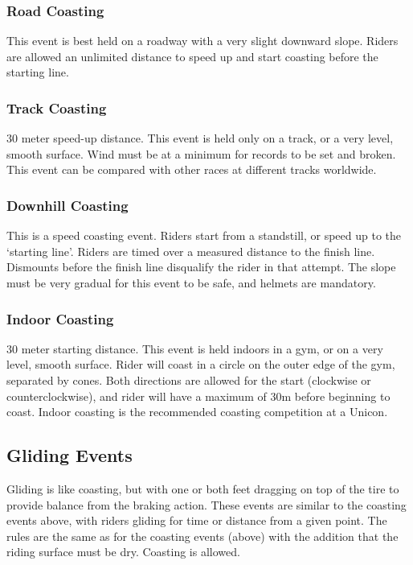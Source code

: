 \subsubsection{Road Coasting}
This event is best held on a roadway with a very slight downward slope.
Riders are allowed an unlimited distance to speed up and start coasting before the starting line.

\subsubsection{Track Coasting \label{subsubsec:track-field_alternate-optional-fun-events_coasting_track-coasting}}
30 meter speed-up distance.
This event is held only on a track, or a very level, smooth surface.
Wind must be at a minimum for records to be set and broken.
This event can be compared with other races at different tracks worldwide.

\subsubsection{Downhill Coasting}
This is a speed coasting event.
Riders start from a standstill, or speed up to the `starting line'.
Riders are timed over a measured distance to the finish line.
Dismounts before the finish line disqualify the rider in that attempt.
The slope must be very gradual for this event to be safe, and helmets are mandatory.

\subsubsection{Indoor Coasting}
30 meter starting distance.
This event is held indoors in a gym, or on a very level, smooth surface.
Rider will coast in a circle on the outer edge of the gym, separated by cones.
Both directions are allowed for the start (clockwise or counterclockwise), and rider will have a maximum of 30m before beginning to coast.
Indoor coasting is the recommended coasting competition at a Unicon.

\subsection{Gliding Events \label{sec:track-field_gliding-events}}
Gliding is like coasting, but with one or both feet dragging on top of the tire to provide balance from the braking action.
These events are similar to the coasting events above, with riders gliding for time or distance from a given point.
The rules are the same as for the coasting events (above) with the addition that the riding surface must be dry.
Coasting is allowed.

